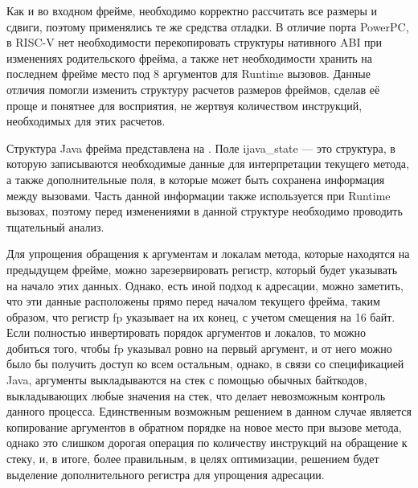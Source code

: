 Как и во входном фрейме, необходимо корректно рассчитать все размеры и сдвиги, поэтому применялись те же средства отладки. В отличие порта PowerPC, в RISC-V нет необходимости перекопировать структуры нативного ABI при изменениях родительского фрейма, а также нет необходимости хранить на последнем фрейме место под 8 аргументов для Runtime вызовов. Данные отличия помогли изменить структуру расчетов размеров фреймов, сделав её проще и понятнее для восприятия, не жертвуя количеством инструкций, необходимых для этих расчетов.


Структура Java фрейма представлена на . Поле ijava_state --- это структура, в которую записываются необходимые данные для интерпретации текущего метода, а также дополнительные поля, в которые может быть сохранена информация между вызовами. Часть данной информации также используется при Runtime вызовах, поэтому перед изменениями в данной структуре необходимо проводить тщательный анализ.

Для упрощения обращения к аргументам и локалам метода, которые находятся на предыдущем фрейме, можно зарезервировать регистр, который будет указывать на начало этих данных. Однако, есть иной подход к адресации, можно заметить, что эти данные расположены прямо перед началом текущего фрейма, таким образом, что регистр fp указывает на их конец, с учетом смещения на 16 байт. Если полностью инвертировать порядок аргументов и локалов, то можно добиться того, чтобы fp указывал ровно на первый аргумент, и от него можно было бы получить доступ ко всем остальным, однако, в связи со спецификацией Java, аргументы выкладываются на стек с помощью обычных байткодов, выкладывающих любые значения на стек, что делает невозможным контроль данного процесса. Единственным возможным решением в данном случае является копирование аргументов в обратном порядке на новое место при вызове метода, однако это слишком дорогая операция по количеству инструкций на обращение к стеку, и, в итоге, более правильным, в целях оптимизации, решением будет выделение дополнительного регистра для упрощения адресации.

